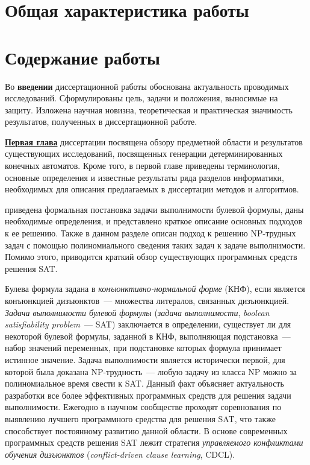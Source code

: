 
\section*{Общая характеристика работы} %



\newpage

\section*{Содержание работы}

Во \textbf{введении} диссертационной работы обоснована актуальность проводимых исследований. Сформулированы цель, задачи и положения, выносимые на защиту. Изложена научная новизна, теоретическая и практическая значимость результатов, полученных в диссертационной работе.

\textbf{\underline{Первая глава}} диссертации посвящена обзору предметной области и результатов существующих исследований, посвященных генерации детерминированных конечных автоматов.
Кроме того, в первой главе приведены терминология, основные определения и известные результаты ряда разделов информатики, необходимых для описания предлагаемых в диссертации методов и алгоритмов.

\insection{\ref{sec:review:sat}} приведена формальная постановка задачи выполнимости булевой формулы, даны необходимые определения, и представлено краткое описание основных подходов к ее решению.
Также в данном разделе описан подход к решению NP-трудных задач с помощью полиномиального сведения таких задач к задаче выполнимости.
Помимо этого, приводится краткий обзор существующих программных средств решения SAT.

Булева формула задана в \emph{конъюнктивно-нормальной форме} (КНФ), если является конъюнкцией дизъюнктов~--- множества литералов, связанных дизъюнкцией.
\emph{Задача выполнимости булевой формулы} (\emph{задача выполнимости}, \emph{boolean satisfiability problem}~{---} SAT) заключается в определении, существует ли для некоторой булевой формулы, заданной в КНФ, выполняющая подстановка~--- набор значений переменных, при подстановке которых формула принимает истинное значение.
Задача выполнимости является исторически первой, для которой была доказана NP-трудность~--- любую задачу из класса NP можно за полиномиальное время свести к SAT.
Данный факт объясняет актуальность разработки все более эффективных программных средств для решения задачи выполнимости.
Ежегодно в научном сообществе проходят соревнования по выявлению лучшего программного средства для решения SAT, что также способствует постоянному развитию данной области.
В основе современных программных средств решения SAT лежит стратегия \emph{управляемого конфликтами обучения дизъюнктов} (\emph{conflict-driven clause learning}, CDCL).

